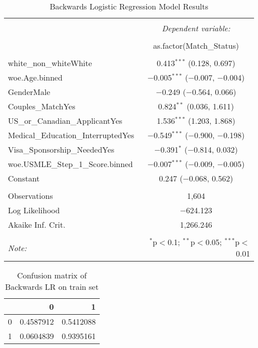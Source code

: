 \documentclass[12pt,]{article}
\begin{document}
\begin{table}[!htbp] \centering 
  \caption{Backwards Logistic Regression Model Results} 
  \label{} 
\begin{tabular}{@{\extracolsep{5pt}}lc} 
\\[-1.8ex]\hline 
\hline \\[-1.8ex] 
 & \multicolumn{1}{c}{\textit{Dependent variable:}} \\ 
\cline{2-2} 
\\[-1.8ex] & as.factor(Match\_Status) \\ 
\hline \\[-1.8ex] 
 white\_non\_whiteWhite & 0.413$^{***}$ (0.128, 0.697) \\ 
  woe.Age.binned & $-$0.005$^{***}$ ($-$0.007, $-$0.004) \\ 
  GenderMale & $-$0.249 ($-$0.564, 0.066) \\ 
  Couples\_MatchYes & 0.824$^{**}$ (0.036, 1.611) \\ 
  US\_or\_Canadian\_ApplicantYes & 1.536$^{***}$ (1.203, 1.868) \\ 
  Medical\_Education\_InterruptedYes & $-$0.549$^{***}$ ($-$0.900, $-$0.198) \\ 
  Visa\_Sponsorship\_NeededYes & $-$0.391$^{*}$ ($-$0.814, 0.032) \\ 
  woe.USMLE\_Step\_1\_Score.binned & $-$0.007$^{***}$ ($-$0.009, $-$0.005) \\ 
  Constant & 0.247 ($-$0.068, 0.562) \\ 
 \hline \\[-1.8ex] 
Observations & 1,604 \\ 
Log Likelihood & $-$624.123 \\ 
Akaike Inf. Crit. & 1,266.246 \\ 
\hline 
\hline \\[-1.8ex] 
\textit{Note:}  & \multicolumn{1}{r}{$^{*}$p$<$0.1; $^{**}$p$<$0.05; $^{***}$p$<$0.01} \\ 
\end{tabular} 
\end{table}

\begin{table}[t]

\caption{\label{tab:conf matrix backwards LR}Confusion matrix of Backwards LR on train set}
\centering
\begin{tabular}{lrr}
\toprule
  & 0 & 1\\
\midrule
\rowcolor{gray!6}  0 & 0.4587912 & 0.5412088\\
1 & 0.0604839 & 0.9395161\\
\bottomrule
\end{tabular}
\end{table}
\end{document}
